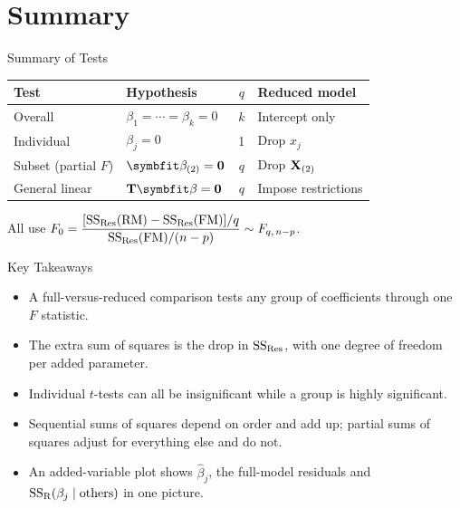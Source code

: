 \section{Summary}


\begin{frame}{Summary of Tests}
    \begin{center}
        \small
        \begin{tabular}{llcl}
            \toprule
            Test & Hypothesis & $q$ & Reduced model \\
            \midrule
            Overall & $\beta_1=\cdots=\beta_k=0$ & $k$ & Intercept only \\
            Individual & $\beta_j=0$ & 1 & Drop $x_j$ \\
            Subset (partial $F$) & $\bbeta_{(2)}=\bzero$ & $q$ & Drop $\mathbf{X}_{(2)}$ \\
            General linear & $\bT\bbeta=\bzero$ & $q$ & Impose restrictions \\
            \bottomrule
        \end{tabular}
    \end{center}
    All use $F_0=\dfrac{[\mathrm{SS}_{\mathrm{Res}}(\mathrm{RM})-\mathrm{SS}_{\mathrm{Res}}(\mathrm{FM})]/q}{\mathrm{SS}_{\mathrm{Res}}(\mathrm{FM})/(n-p)}\sim F_{q,\,n-p}$.
\end{frame}


\begin{frame}{Key Takeaways}
    \begin{itemize}
        \item A full-versus-reduced comparison tests any group of coefficients through one $F$ statistic.
        \item The extra sum of squares is the drop in $\mathrm{SS}_{\mathrm{Res}}$, with one degree of freedom per added parameter.
        \item Individual $t$-tests can all be insignificant while a group is highly significant.
        \item Sequential sums of squares depend on order and add up; partial sums of squares adjust for everything else and do not.
        \item An added-variable plot shows $\hat\beta_j$, the full-model residuals and $\mathrm{SS}_{\mathrm{R}}(\beta_j\mid\text{others})$ in one picture.
    \end{itemize}
\end{frame}
